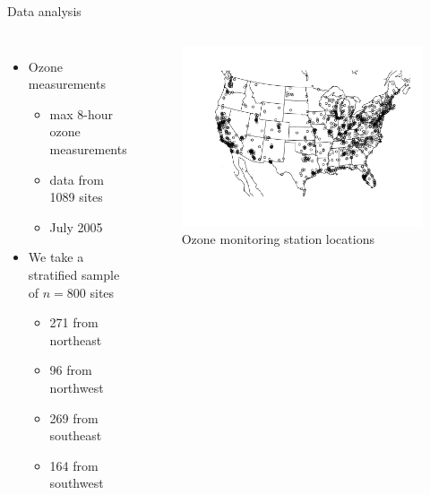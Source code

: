 \documentclass{beamer}
\begin{document}
\begin{frame}{Data analysis}
\begin{columns}[c]
	\begin{itemize} \setlength{\itemsep}{0.5em}
	\item Ozone measurements
	\begin{itemize}
		\item max 8-hour ozone measurements
		\item data from 1089 sites
		\item July 2005
	\end{itemize}
  \item We take a stratified sample of $n = 800$ sites
  \begin{itemize}
    \item 271 from northeast
    \item 96 from northwest
    \item 269 from southeast
    \item 164 from southwest
  \end{itemize}
	\end{itemize}

	\begin{figure}
    \includegraphics[width=1\linewidth]{./plots/pot/ozone_stations.pdf}
    \caption{Ozone monitoring station locations}
    \end{figure}
\end{columns}
\end{frame}
\end{document}
